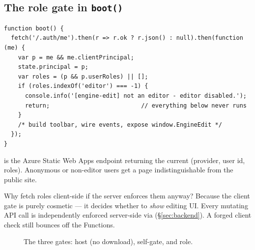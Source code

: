 \documentclass[11pt]{article}
\begin{document}
\subsection{The role gate in \texttt{boot()}}

\begin{lstlisting}
function boot() {
  fetch('/.auth/me').then(r => r.ok ? r.json() : null).then(function (me) {
    var p = me && me.clientPrincipal;
    state.principal = p;
    var roles = (p && p.userRoles) || [];
    if (roles.indexOf('editor') === -1) {
      console.info('[engine-edit] not an editor - editor disabled.');
      return;                          // everything below never runs
    }
    /* build toolbar, wire events, expose window.EngineEdit */
  });
}
\end{lstlisting}

 is the Azure Static Web Apps endpoint returning the current
 (provider, user id, roles). Anonymous or non-editor users
get a page indistinguishable from the public site.

Why fetch roles client-side if the server enforces them anyway? Because the client
gate is purely cosmetic --- it decides whether to \emph{show} editing UI. Every
mutating API call is independently enforced server-side via 
(\S\ref{sec:backend}). A forged client check still bounces off the Functions.

\begin{figure}[h]
\centering
{}
\caption{The three gates: host (no download), self-gate, and role.}
\end{figure}
\end{document}
